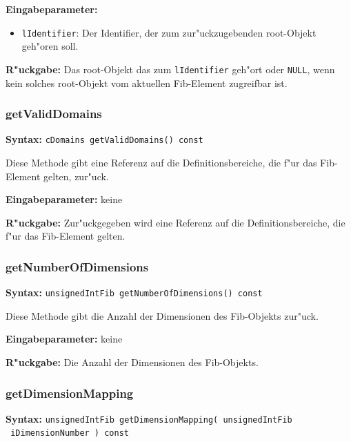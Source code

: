 \bigskip\noindent
\textbf{Eingabeparameter:}
\begin{itemize}
 \item \verb|lIdentifier|: Der Identifier, der zum zur"uckzugebenden root-Objekt geh"oren soll.
\end{itemize}

\bigskip\noindent
\textbf{R"uckgabe:} Das root-Objekt das zum \verb|lIdentifier| geh"ort oder \verb|NULL|, wenn kein solches root-Objekt vom aktuellen Fib-Element zugreifbar ist.


\subsubsection{getValidDomains}

\textbf{Syntax:} \verb|cDomains getValidDomains() const|

\bigskip\noindent
Diese Methode gibt eine Referenz auf die Definitionsbereiche, die f"ur das Fib-Element gelten, zur"uck.

\bigskip\noindent
\textbf{Eingabeparameter:} keine

\bigskip\noindent
\textbf{R"uckgabe:} Zur"uckgegeben wird eine Referenz auf die Definitionsbereiche, die f"ur das Fib-Element gelten.


\subsubsection{getNumberOfDimensions}

\textbf{Syntax:} \verb|unsignedIntFib getNumberOfDimensions() const|

\bigskip\noindent
Diese Methode gibt die Anzahl der Dimensionen des Fib-Objekts zur"uck.

\bigskip\noindent
\textbf{Eingabeparameter:} keine

\bigskip\noindent
\textbf{R"uckgabe:} Die Anzahl der Dimensionen des Fib-Objekts.


\subsubsection{getDimensionMapping}

\textbf{Syntax:} \verb|unsignedIntFib getDimensionMapping( unsignedIntFib| \\\verb| iDimensionNumber ) const|

